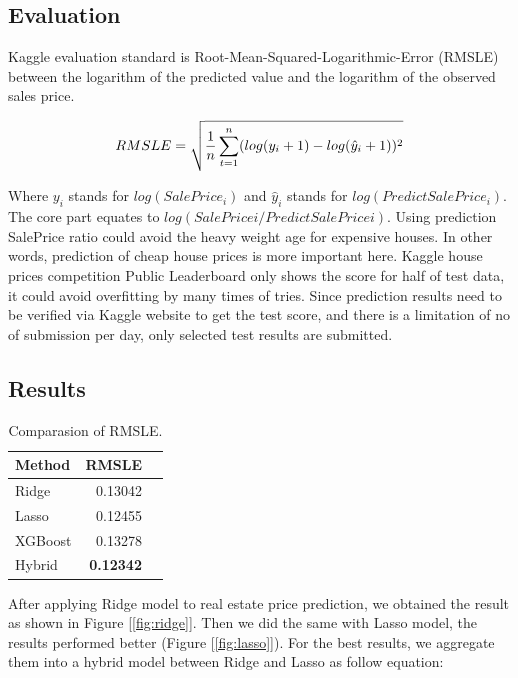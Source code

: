 \documentclass[11pt,a4paper]{article}
\begin{document}
\subsection{Evaluation}

Kaggle evaluation standard is Root-Mean-Squared-Logarithmic-Error (RMSLE) between the logarithm of the predicted value and the logarithm of the observed sales price.

\begin{equation}
\label{eq: RMSLE}
RMSLE = \sqrt{\frac{1}{n}\sum_{t=1}^{n}(log(y_i+1) - log(\hat{y}_i+1))^2} \\
\end{equation}

Where \(y_i\) stands for \(log(SalePrice_i)\) and \(\hat{y}_i\) stands for
\(log(PredictSalePrice_i)\). The core part equates to \(log(SalePricei/PredictSalePricei)\). Using prediction SalePrice ratio could avoid the heavy weight age for expensive houses. In other words, prediction of cheap house prices is more important here. Kaggle house prices competition Public Leaderboard only shows the score for half of test data, it could avoid overfitting by many times of tries. Since prediction results need to be verified via Kaggle website to get the test score, and there is a limitation of no of submission per day, only selected test results are submitted. 

\subsection{Results}

\begin{table}
\centering
\begin{tabular}{lrl}
\hline \textbf{Method} & \textbf{RMSLE} \\ \hline
 Ridge & 0.13042 \\
 Lasso & 0.12455  \\
 XGBoost & 0.13278 \\
 Hybrid & \textbf{0.12342}  \\
\hline
\end{tabular}
\caption{\label{font-table} Comparasion of RMSLE. }
\label{table: rmsle}
\end{table}

After applying Ridge model to real estate price prediction, we obtained the result as shown in Figure [\ref{fig:ridge}]. Then we did the same with Lasso model, the results performed better (Figure [\ref{fig:lasso}]). For the best results, we aggregate them into a hybrid model between Ridge and Lasso as follow equation:
\end{document}
